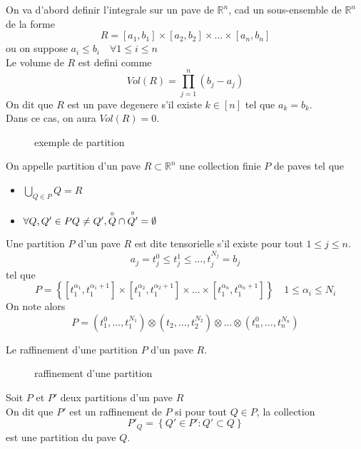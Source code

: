 \documentclass[../main.tex]{subfiles}
\begin{document}
On va d'abord definir l'integrale sur un pave de $ \mathbb{R}^n	$, cad un sous-ensemble de $ \mathbb{R}^n$ de la forme
\[ 
R = [ a_1,b_1] \times [ a_2,b_2] \times \ldots \times [ a_n,b_n] 
\]
ou on suppose $a_i \leq  b_i \quad \forall 1 \leq  i \leq  n$\\
Le volume de $R$ est defini comme 
\[ 
	Vol( R) = \prod_{j=1} ^{n} ( b_j-a_j) 
\]
On dit que $R$ est un pave degenere s'il existe $k \in [ n] $ tel que $a_k = b_k$.\\
Dans ce cas, on aura $Vol( R) =0$.\\
\begin{defn}[Partition]
\begin{figure}[H]
    \centering
    \caption{exemple de partition}
    \label{fig:exemple-de-partition}
\end{figure}
On appelle partition d'un pave $R \subset \mathbb{R}^n$ une collection finie $P$ de paves tel que
\begin{itemize}
	\item $\bigcup_{Q \in P} Q= R$ 
	\item $\forall Q, Q' \in P  Q \neq Q', \overset{\circ}{Q} \cap \overset{\circ}{ Q' }= \emptyset$
\end{itemize}

\end{defn}
\begin{defn}
	Une partition $P$ d'un pave $R$ est dite tensorielle s'il existe pour tout  $ 1 \leq  j \leq  n$.\\
	\[ 
		a_j = t_j^{0} \leq t_j^{1} \leq  \ldots, t_j ^{N_j} = b_j
	\]
	tel que 
	\[ 
	P = \left\{ [ t_1^{\alpha_1}, t_1^{\alpha_1+1}] \times  [ t_1^{\alpha_2}, t_1^{\alpha_2+1}] \times \ldots \times  [ t_1^{\alpha_n}, t_1^{\alpha_n+1}]\right\} \quad 1 \leq  \alpha_i \leq  N_i
	\]
	On note alors
	\[ 
		P = ( t_1^{0}, \ldots, t_1 ^{N_1}) \otimes ( t_2, \ldots, t_2^{N_2}) \otimes \ldots \otimes ( t_n^{0}, \ldots, t_n^{N_n}) 
	\]
	
\end{defn}
\begin{defn}
	Le raffinement d'une partition $P$ d'un pave $R$.
\begin{figure}[H]
    \centering
    \caption{raffinement d'une partition}
    \label{fig:raffinement-d-une-partition}
\end{figure}
Soit $P$ et $P'$ deux partitions d'un pave $R$ \\
On dit que $P'$ est un raffinement de $P$ si pour tout $Q \in P$, la collection 
\[ 
P'_Q = \left\{ Q' \in P': Q' \subset Q \right\} 
\]
est une partition du pave $Q$.


\end{defn}
\end{document}
